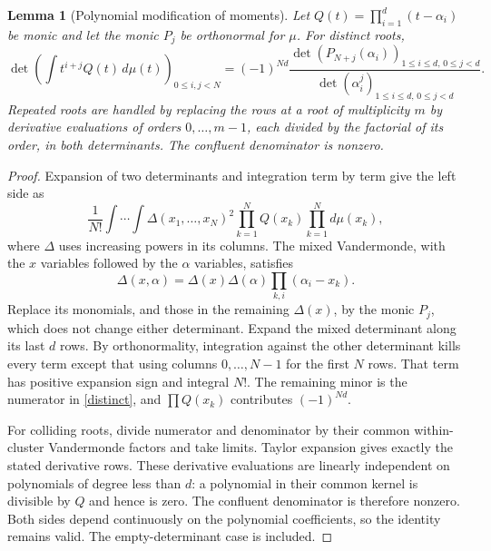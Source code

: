\documentclass[10pt]{article}
\newtheorem{lemma}{Lemma}
\begin{document}
\begin{lemma}[Polynomial modification of moments]\label{christoffel}
Let $Q(t)=\prod_{i=1}^d(t-\alpha_i)$ be monic and let the monic
$P_j$ be orthonormal for $\mu$. For distinct roots,
\begin{equation}\label{distinct}
 \det\left(\int t^{i+j}Q(t)\,d\mu(t)\right)_{0\le i,j<N}
 =(-1)^{Nd}\frac{\det(P_{N+j}(\alpha_i))_{1\le i\le d,\,0\le j<d}}
 {\det(\alpha_i^j)_{1\le i\le d,\,0\le j<d}}.
\end{equation}
Repeated roots are handled by replacing the rows at a root of
multiplicity $m$ by derivative evaluations of orders $0,\ldots,m-1$,
each divided by the factorial of its order, in both determinants.
The confluent denominator is nonzero.
\end{lemma}
\begin{proof}
Expansion of two determinants and integration term by term give
the left side as
\[
 \frac1{N!}\int\cdots\int
 \Delta(x_1,\ldots,x_N)^2\prod_{k=1}^N Q(x_k)\prod_{k=1}^N d\mu(x_k),
\]
where $\Delta$ uses increasing powers in its columns. The mixed
Vandermonde, with the $x$ variables followed by the $\alpha$ variables,
satisfies
\[
 \Delta(x,\alpha)=\Delta(x)\Delta(\alpha)\prod_{k,i}(\alpha_i-x_k).
\]
Replace its monomials, and those in the remaining $\Delta(x)$,
by the monic $P_j$, which does not change either determinant.
Expand the mixed determinant along its last $d$ rows. By
orthonormality, integration against the other determinant kills
every term except that using columns $0,\ldots,N-1$ for the first
$N$ rows. That term has positive expansion sign and integral $N!$.
The remaining minor is the numerator in \eqref{distinct}, and
$\prod Q(x_k)$ contributes $(-1)^{Nd}$.

For colliding roots, divide numerator and denominator by their
common within-cluster Vandermonde factors and take limits. Taylor
expansion gives exactly the stated derivative rows. These derivative
evaluations are linearly independent on polynomials of degree less
than $d$: a polynomial in their common kernel is divisible by $Q$
and hence is zero. The confluent denominator is therefore nonzero.
Both sides depend continuously on the polynomial coefficients, so
the identity remains valid. The empty-determinant case is included.
\end{proof}
\end{document}
